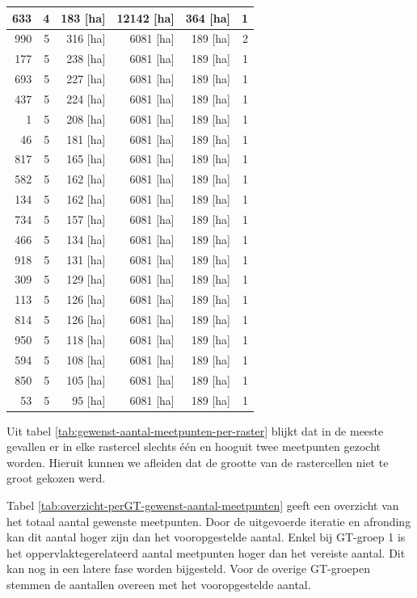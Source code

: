 \documentclass[11pt,]{book}
\begin{document}
\begin{table}
\begin{tabular}[t]{r|r|r|r|r|r}
\hline
633 & 4 & 183 [ha] & 12142 [ha] & 364 [ha] & 1\\
\hline
990 & 5 & 316 [ha] & 6081 [ha] & 189 [ha] & 2\\
\hline
177 & 5 & 238 [ha] & 6081 [ha] & 189 [ha] & 1\\
\hline
693 & 5 & 227 [ha] & 6081 [ha] & 189 [ha] & 1\\
\hline
437 & 5 & 224 [ha] & 6081 [ha] & 189 [ha] & 1\\
\hline
1 & 5 & 208 [ha] & 6081 [ha] & 189 [ha] & 1\\
\hline
46 & 5 & 181 [ha] & 6081 [ha] & 189 [ha] & 1\\
\hline
817 & 5 & 165 [ha] & 6081 [ha] & 189 [ha] & 1\\
\hline
582 & 5 & 162 [ha] & 6081 [ha] & 189 [ha] & 1\\
\hline
134 & 5 & 162 [ha] & 6081 [ha] & 189 [ha] & 1\\
\hline
734 & 5 & 157 [ha] & 6081 [ha] & 189 [ha] & 1\\
\hline
466 & 5 & 134 [ha] & 6081 [ha] & 189 [ha] & 1\\
\hline
918 & 5 & 131 [ha] & 6081 [ha] & 189 [ha] & 1\\
\hline
309 & 5 & 129 [ha] & 6081 [ha] & 189 [ha] & 1\\
\hline
113 & 5 & 126 [ha] & 6081 [ha] & 189 [ha] & 1\\
\hline
814 & 5 & 126 [ha] & 6081 [ha] & 189 [ha] & 1\\
\hline
950 & 5 & 118 [ha] & 6081 [ha] & 189 [ha] & 1\\
\hline
594 & 5 & 108 [ha] & 6081 [ha] & 189 [ha] & 1\\
\hline
850 & 5 & 105 [ha] & 6081 [ha] & 189 [ha] & 1\\
\hline
53 & 5 & 95 [ha] & 6081 [ha] & 189 [ha] & 1\\
\hline
\end{tabular}
\end{table}

 Uit tabel \ref{tab:gewenst-aantal-meetpunten-per-raster} blijkt dat in
de meeste gevallen er in elke rastercel slechts één en hooguit twee
meetpunten gezocht worden. Hieruit kunnen we afleiden dat de grootte van
de rastercellen niet te groot gekozen werd.

Tabel \ref{tab:overzicht-perGT-gewenst-aantal-meetpunten} geeft een
overzicht van het totaal aantal gewenste meetpunten. Door de uitgevoerde
iteratie en afronding kan dit aantal hoger zijn dan het vooropgestelde
aantal. Enkel bij GT-groep 1 is het oppervlaktegerelateerd aantal
meetpunten hoger dan het vereiste aantal. Dit kan nog in een latere fase
worden bijgesteld. Voor de overige GT-groepen stemmen de aantallen
overeen met het vooropgestelde aantal.
\end{document}
